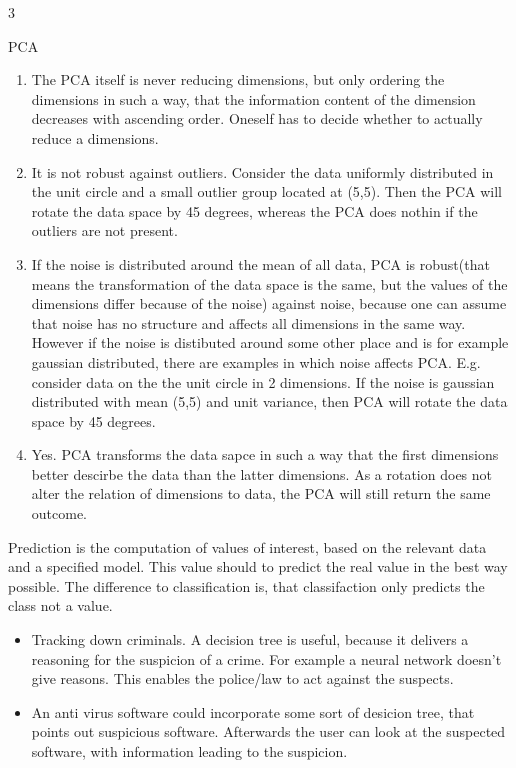 \documentclass{article}
\begin{document}
\begin{ukon-infie}[15.11.17]{3}
\begin{exercise}[p=9]{PCA}
{\begin{enumerate}
        			\item The PCA itself is never reducing dimensions, but only ordering the dimensions in such a way, that the information content of the dimension decreases with ascending order. Oneself has to decide whether to actually reduce a dimensions.
        			\item It is not robust against outliers. Consider the data uniformly distributed in the unit circle and a small outlier group located at (5,5). Then the PCA will rotate the data space by 45 degrees, whereas the PCA does nothin if the outliers are not present.
        			\item If the noise is distributed around the mean of all data, PCA is robust(that means the transformation of the data space is the same, but the values of the dimensions differ because of the noise) against noise, because one can assume that noise has no structure and affects all dimensions in the same way. However if the noise is distibuted around some other place and is for example gaussian distributed, there are examples in which noise affects PCA. E.g. consider data on the the unit circle in 2 dimensions. If the noise is gaussian distributed with mean (5,5) and unit variance, then PCA will rotate the data space by 45 degrees.
        			\item Yes. PCA transforms the data sapce in such a way that the first dimensions better descirbe the data than the latter dimensions. As a rotation does not alter the relation of dimensions to data, the PCA will still return the same outcome.
        		\end{enumerate}
        	}
		
		\end{exercise}
		
		\begin{exercise}[p=1]{}
		Prediction is the computation of values of interest, based on the relevant data and a specified model. This value should to predict the real value in the best way possible. The difference to classification is, that classifaction only predicts the class not a value. 		
		
		\end{exercise}
		
		\begin{exercise}[p=2]{}

		\begin{itemize}
			\item Tracking down criminals. A decision tree is useful, because it delivers a reasoning for the suspicion of a crime. For example a neural network doesn't give reasons. This enables the police/law to act against the suspects.
			\item An anti virus software could incorporate some sort of desicion tree, that points out suspicious software. Afterwards the user can look at the suspected software, with information leading to the suspicion.
		\end{itemize}			
		

\end{exercise}
\end{ukon-infie}
\end{document}
